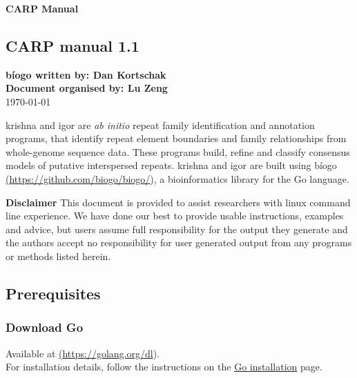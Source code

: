 \documentclass[a4paper,12pt]{article}
\begin{document}
 \sloppy
	
	\begin{center}
		\huge \textbf{CARP Manual}
	\end{center}
	
	\tableofcontents
	\newpage
	
	\pagebreak
	
	
	
	\begin{center}
		\section{CARP manual 1.1}
		\noindent\textbf{b\'iogo written by: Dan Kortschak} \\
		\textbf{Document organised by: Lu Zeng} \\
		\today
	\end{center}
	
	\noindent krishna and igor are \textit{ab initio} repeat family identification and annotation programs, that  identify repeat element boundaries and family relationships from whole-genome sequence data. These programs build, refine and classify consensus models of putative interspersed repeats. krishna and igor are built using b\'iogo \href{<url>}(\url{https://github.com/biogo/biogo/}), a bioinformatics library for the Go language. 
	
	\noindent \textbf{Disclaimer} This document is provided to assist researchers with linux command line experience.  We have done our best to provide usable instructions, examples and advice, but users assume full responsibility for the output they generate and the authors accept no responsibility for user generated output from any programs or methods listed herein.  
	
	
	\subsection{{Prerequisites}}
	
	\subsubsection{ Download Go }
	Available at \href{<url>} (\url{https://golang.org/dl}).\\
	For installation details, follow the instructions on the \href{https://golang.org/doc/install#install} {\color{blue}Go installation} page. 
	
\end{document}
